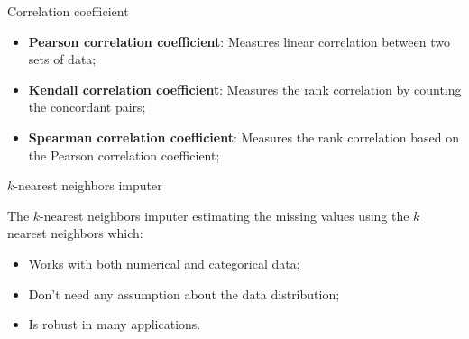 \documentclass{beamer}
\begin{document}
\begin{frame}{Correlation coefficient  }

  \begin{itemize}
    \item \textbf{Pearson correlation coefficient}: Measures linear correlation between two sets of data; \vspace{.25cm}
    \item \textbf{Kendall correlation coefficient}: Measures the rank correlation by counting the concordant pairs; \vspace{.25cm}
    \item \textbf{Spearman correlation coefficient}: Measures the rank correlation based on the Pearson correlation coefficient; \vspace{.25cm}
  \end{itemize}

\end{frame}

\begin{frame}{$k$-nearest neighbors imputer  }

  The $k$-nearest neighbors imputer estimating the missing values using the $k$ nearest neighbors which: \vspace{.25cm}

  \begin{itemize}
    \item Works with both numerical and categorical data; \vspace{.25cm}
    \item Don't need any assumption about the data distribution; \vspace{.25cm}
    \item Is robust in many applications. \vspace{.25cm}
  \end{itemize}

\end{frame}
\end{document}
